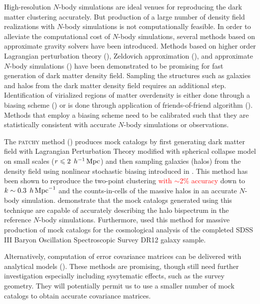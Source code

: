 \documentclass[english,usenatbib]{mn2e}
\newcommand{\tod}[1]{{\textcolor{red}{ #1}}}
\newcommand{\mperh}{\,h^{-1}\,{\rm Mpc}}
\newcommand{\hperm}{\,h\,{\rm Mpc}^{-1}}
\begin{document}
High-resolution $N$-body simulations are ideal venues for reproducing the dark matter clustering accurately. But production of a large number of density field realizations with $N$-body simulations is not computationally feasible. In order to alleviate the computational cost of $N$-body simulations, several methods based on approximate gravity solvers have been introduced. Methods based on higher order Lagrangian perturbation theory (\citealt{buchert1993,bouchet1995,catelan1995,monaco2002,scocci2002,alpt}), Zeldovich approximation (\citealt{eazymock}), and approximate $N$-body simulations (\citealt{cola2013,qpm,howlet2015,cola,fastpm,ice_cola,koda}) have been demonstrated to be promising for fast generation of dark matter density field. Sampling the structures such as galaxies and halos from the dark matter density field requires an additional step. Identification of virialized regions of matter overdensity is either done through a biasing scheme (\citealt{kitaura2014,qpm}) or is done through application of friends-of-friend algorithm (\citealt{pthalo,koda,fastpm}). Methods that employ a biasing scheme need to be calibrated such that they are statistically consistent with accurate $N$-body simulations or observations. 

The \textsc{patchy} method (\citealt{kitaura2014,kitaura2015}) produces mock catalogs by first generating dark matter field with Lagrangian Perturbation Theory modified with spherical collapse model on small scales ($r \leq 2 \; \mperh$) and then sampling galaxies (halos) from the density field using nonlinear stochastic biasing introduced in \citet{kitaura2014}. This method has been shown to reproduce the two-point clustering \tod{with $\sim$2\% accuracy} down to $k \sim 0.3 \; \hperm$ and the counts-in-cells of the massive halos in an accurate $N$-body simulation. \citet{kitaura2015} demonstrate that the mock catalogs generated using this technique are capable of accurately describing the halo bispectrum in the reference $N$-body simulations. Furthermore, \citet{kitaura2016} used this method for massive production of mock catalogs for the cosmological analysis of the completed SDSS III Baryon Oscillation Spectroscopic Survey DR12 galaxy sample. 

Alternatively, computation of error covariance matrices can be delivered with analytical models (\citealt{feldman1994,smith2008,crocce2011,sun2013,grieb2016,klaus2016}). 
These methods are promising, though still need further investigation especially including sysytematic effects, such as the survey geometry. They will potentially permit us to use a smaller number of mock catalogs to obtain accurate covariance matrices.
\end{document}
